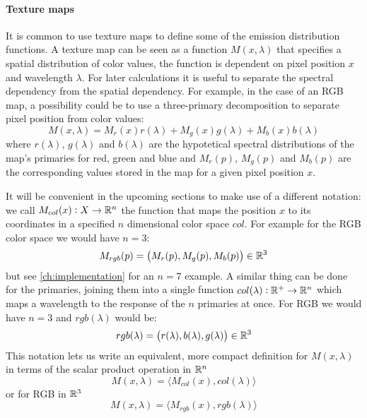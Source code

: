\paragraph{Texture maps}
It is common to use texture maps to define some of the emission distribution
functions. A texture map can be seen as a function $M(x,\lambda)$ that specifies
a spatial distribution of color values, the function is dependent on pixel
position $x$ and wavelength $\lambda$.
For later calculations it is useful to separate the spectral dependency from the
spatial dependency. For example, in the case of an \gls{RGB} map, a possibility
could be to use a three-primary decomposition to separate pixel position from
color values:
\begin{equation}
M(x,\lambda) = M_r(x) r(\lambda) + M_g(x) g(\lambda) + M_b(x) b(\lambda)
\end{equation}
where $r(\lambda)$, $g(\lambda)$ and $b(\lambda)$ are the hypotetical spectral
distributions of the map's primaries for red, green and blue and $M_r(p)$,
$M_g(p)$ and $M_b(p)$ are the corresponding values stored in the map for a
given pixel position $x$.

It will be convenient in the upcoming sections to make use of a different
notation: we call $M_{col}(x): X\to\mathbb{R}^n$ the function that maps the position $x$
to its coordinates in a specified $n$ dimensional color space $col$. For example
for the \gls{RGB} color space we would have $n = 3$:
\begin{equation}
M_{rgb}(p) = \big(M_r(p), M_g(p), M_b(p)\big) \in \mathbb{R}^3
\end{equation}
but see \cref{ch:implementation} for an $n=7$ example. A similar thing
can be done for the primaries, joining them into a single function
$col(\lambda): \mathbb{R}^+\to\mathbb{R}^n$ which maps a wavelength to the response of the $n$
primaries at once. For \gls{RGB} we would have $n = 3$ and $rgb(\lambda)$ would be:
\begin{equation}
rgb(\lambda) = \big(r(\lambda), b(\lambda), g(\lambda)\big) \in\mathbb{R}^3
\end{equation}
This notation lets us write an equivalent, more compact definition for
$M(x,\lambda)$ in terms of the scalar product operation in $\mathbb{R}^n$
\begin{equation}
M(x,\lambda) = \big\langle M_{col}(x), col(\lambda) \big\rangle
\end{equation}
or for \gls{RGB} in $\mathbb{R}^3$
\begin{equation}
M(x,\lambda) = \big\langle M_{rgb}(x), rgb(\lambda) \big\rangle
\end{equation}

